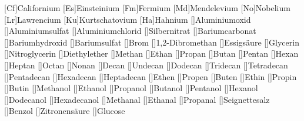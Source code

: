 [Cf]{Californium}%
[Es]{Einsteinium}%
[Fm]{Fermium}%
[Md]{Mendelevium}%
[No]{Nobelium}%
[Lr]{Lawrencium}%
[Ku]{Kurtschatovium}%
[Ha]{Hahnium}%
[]{Aluminiumoxid}%
[]{Aluminiumsulfat}%
[]{Aluminiumchlorid}%
[]{Silbernitrat}%
[]{Bariumcarbonat}%
[]{Bariumhydroxid}%
[]{Bariumsulfat}%
[]{Brom}%
[]{1,2-Dibromethan}%
[]{Essigsäure}%
[]{Glycerin}%
[]{Nitroglycerin}%
[]{Diethylether}%
[]{Methan}%
[]{Ethan}%
[]{Propan}%
[]{Butan}%
[]{Pentan}%
[]{Hexan}%
[]{Heptan}%
[]{Octan}%
[]{Nonan}%
[]{Decan}%
[]{Undecan}%
[]{Dodecan}%
[]{Tridecan}%
[]{Tetradecan}%
[]{Pentadecan}%
[]{Hexadecan}%
[]{Heptadecan}%
[]{Ethen}%
[]{Propen}%
[]{Buten}%
[]{Ethin}%
[]{Propin}%
[]{Butin}%
[]{Methanol}%
[]{Ethanol}%
[]{Propanol}%
[]{Butanol}%
[]{Pentanol}%
[]{Hexanol}%
[]{Dodecanol}%
[]{Hexadecanol}%
[]{Methanal}%
[]{Ethanal}%
[]{Propanal}%
[]{Seignettesalz}%
[]{Benzol}%
[]{Zitronensäure}%
[]{Glucose}%
